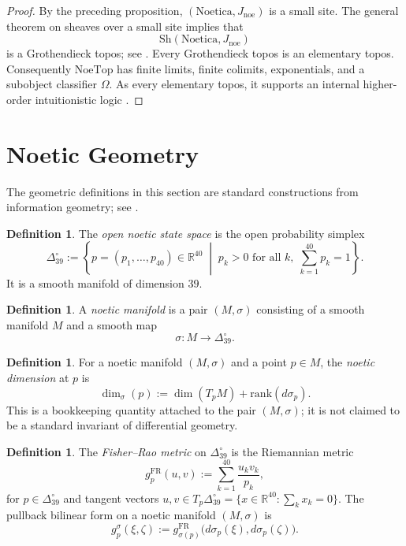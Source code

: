 \documentclass[11pt]{amsart}
\numberwithin{equation}{section}
\theoremstyle{definition}
\newtheorem{definition}[theorem]{Definition}
\theoremstyle{remark}
\newcommand{\Noetica}{\mathrm{Noetica}}
\newcommand{\NoeTop}{\mathrm{NoeTop}}
\newcommand{\Sh}{\mathrm{Sh}}
\newcommand{\Jnoe}{J_{\mathrm{noe}}}
\newcommand{\Deltaopen}{\Delta_{39}^{\circ}}
\newcommand{\R}{\mathbb{R}}
\begin{document}
\begin{proof}
By the preceding proposition, \((\Noetica,\Jnoe)\) is a small site. The general theorem on sheaves over a small site implies that
\[
\Sh(\Noetica,\Jnoe)
\]
is a Grothendieck topos; see \cite[Chap.~VII, Thm.~1]{MacLaneMoerdijk1992}. Every Grothendieck topos is an elementary topos. Consequently \(\NoeTop\) has finite limits, finite colimits, exponentials, and a subobject classifier \(\Omega\). As every elementary topos, it supports an internal higher-order intuitionistic logic \cite[Chap.~VI]{MacLaneMoerdijk1992}.
\end{proof}

\section{Noetic Geometry}

The geometric definitions in this section are standard constructions from information geometry; see \cite{AmariNagaoka2000}.

\begin{definition}
The \emph{open noetic state space} is the open probability simplex
\[
\Deltaopen
:=
\left\{
p=(p_1,\dots,p_{40}) \in \R^{40}
\;\middle|\;
p_k>0 \text{ for all } k,\;
\sum_{k=1}^{40} p_k = 1
\right\}.
\]
It is a smooth manifold of dimension \(39\).
\end{definition}

\begin{definition}
A \emph{noetic manifold} is a pair \((M,\sigma)\) consisting of a smooth manifold \(M\) and a smooth map
\[
\sigma : M \to \Deltaopen.
\]
\end{definition}

\begin{definition}
For a noetic manifold \((M,\sigma)\) and a point \(p \in M\), the \emph{noetic dimension} at \(p\) is
\[
\dim_{\sigma}(p) := \dim(T_pM) + \mathrm{rank}(d\sigma_p).
\]
This is a bookkeeping quantity attached to the pair \((M,\sigma)\); it is not claimed to be a standard invariant of differential geometry.
\end{definition}

\begin{definition}
The \emph{Fisher--Rao metric} on \(\Deltaopen\) is the Riemannian metric
\[
g^{\mathrm{FR}}_p(u,v)
:=
\sum_{k=1}^{40}\frac{u_kv_k}{p_k},
\]
for \(p \in \Deltaopen\) and tangent vectors \(u,v \in T_p\Deltaopen = \{x \in \R^{40} : \sum_k x_k = 0\}\).
The pullback bilinear form on a noetic manifold \((M,\sigma)\) is
\[
g^{\sigma}_p(\xi,\zeta)
:=
g^{\mathrm{FR}}_{\sigma(p)}\bigl(d\sigma_p(\xi),d\sigma_p(\zeta)\bigr).
\]
\end{definition}
\end{document}
